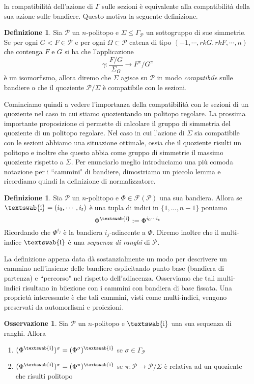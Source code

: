 \documentclass[a4paper,12pt]{report}
\newcommand{\p}{\mathcal{P}}
\theoremstyle{plain}
\theoremstyle{definition}
\newtheorem{defin}[teo]{Definizione}
\newtheorem{oss}[teo]{Osservazione}
\newcommand\multi[1]{\text{\textswab{#1}}}
\newcommand\flag[1]{\mathcal{F}(#1)}
\begin{document}
la compatibilit\`a dell'azione di $\Gamma$ sulle sezioni \`e equivalente alla compatibilit\`a della sua azione sulle bandiere. Questo motiva la seguente
definizione.
\begin{defin}
\label{def:SectionCompatible}
Sia $\p$ un $n$-politopo e $\Sigma\leq\Gamma_\p$ un sottogruppo di sue simmetrie. Se per ogni $G<F\in\p$ e per ogni $\Omega\subset\p$ catena di tipo
$(-1,\cdots,rkG,rkF,\cdots,n)$ che contenga $F$ e $G$ si ha che l'applicazione
\begin{equation}
\gamma:\frac{F/G}{\Sigma_\Omega}\longrightarrow F^\pi/G^\pi
\end{equation}
\`e un isomorfismo, allora diremo che $\Sigma$ agisce su $\p$ in modo \emph{compatibile} sulle bandiere o che il quoziente $\p/\Sigma$ \`e compatibile
con le sezioni.
\end{defin}
Cominciamo quindi a vedere l'importanza della compatibilit\`a con le sezioni di un quoziente nel caso in cui stiamo quozientando un politopo regolare.
La prossima importante proposizione ci permette di calcolare il gruppo di simmetria del quoziente di un politopo regolare. Nel caso in cui l'azione
di $\Sigma$ sia compatibile con le sezioni abbiamo una situazione ottimale, ossia che il quoziente risulti un politopo e inoltre che questo abbia
come gruppo di simmetrie il massimo quoziente rispetto a $\Sigma$. Per enunciarlo meglio introduciamo una pi\`u comoda
notazione per i ``cammini" di bandiere, dimostriamo un piccolo lemma e ricordiamo quindi la definizione di normalizzatore.
\begin{defin}
Sia $\p$ un $n$-politopo e $\Phi\in\flag\p$ una sua bandiera. Allora se $\multi{i}=(i_0,\cdots,i_t)$ \`e una tupla di indici in
$\{1,\dots,n-1\}$ poniamo
\begin{equation*}
\Phi^\multi{i}:=\Phi^{i_0\cdots i_t}
\end{equation*}
Ricordando che $\Phi^{i_j}$ \`e la bandiera $i_j$-adiacente a $\Phi$. Diremo inoltre che il multi-indice $\multi{i}$ \`e
una \emph{sequenza di ranghi} di $\p$.
\end{defin}
La definizione appena data d\`a sostanzialmente un modo per descrivere un cammino nell'insieme delle bandiere esplicitando punto base
(bandiera di partenza) e ``percorso" nel rispetto dell'adiacenza. Osserviamo che tali multi-indici risultano in biiezione con i cammini
con bandiera di base fissata. Una propriet\`a interessante \`e che tali cammini, visti come multi-indici, vengono preservati da automorfismi
e proiezioni.
\begin{oss}
\label{oss:PathAction}
Sia $\p$ un $n$-politopo e $\multi{i}$ una sua sequenza di ranghi. Allora
\begin{enumerate}
\item$(\Phi^\multi{i})^\sigma=(\Phi^\sigma)^\multi{i}$ se $\sigma\in\Gamma_\p$\\
\item$(\Phi^\multi{i})^\pi=(\Phi^\pi)^{\multi{i}}$ se $\pi:\p\longrightarrow\p/\Sigma$ \`e relativa ad un quoziente che risulti politopo
\end{enumerate}
\end{oss}
\end{document}
